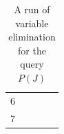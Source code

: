\documentclass[12pt,a4paper]{article}
\begin{document}
\begin{table}[!h]
\begin{tabular}{c|l|l|l|l}
6    &                                                                                    &                                                                             &                                                                                   &                                                                          \\
7    &                                                                                    &                                                                             &                                                                                   &                                                                         
\end{tabular}
\caption{A run of variable elimination for the query $P(J)$}
\label{table:VE}
\end{table}



\end{document}
